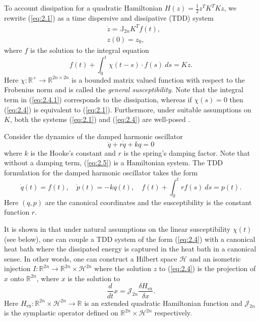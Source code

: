 To account dissipation for a quadratic Hamiltonian $H(z) = \frac 1 2 z^T K^T K  z$, we rewrite (\ref{eq:2.1}) as a time dispersive and dissipative (TDD) \cite{Figotin:2006jy} system 
\begin{equation} \label{eq:2.4}
	\begin{aligned}
		& \dot {z} = \mathbb J_{2n} K^T f(t), \\
		& z(0) = z_0,
	\end{aligned}
\end{equation}
where $f$ is the solution to the integral equation
\begin{equation} \label{eq:2.4.1}
	f(t) + \int_0^t \chi(t-s) \cdot f(s)\ ds = K z.
\end{equation}
Here $\chi:\mathbb R^+\to \mathbb R^{2n\times 2n}$ is a bounded matrix valued function with respect to the Frobenius norm and is called the \emph{general susceptibility}. Note that the integral term in (\ref{eq:2.4.1}) corresponds to the dissipation, whereas if $\chi(s) = 0$ then (\ref{eq:2.4}) is equivalent to (\ref{eq:2.1}). Furthermore, under suitable assumptions on $K$, both the systems (\ref{eq:2.1}) and (\ref{eq:2.4}) are well-posed \cite{Figotin:2006jy}.

\begin{example} \label{example:2.1}
Consider the dynamics of the damped harmonic oscillator
\begin{equation} \label{eq:2.5}
	\ddot q + r \dot q + k q = 0
\end{equation}
where $k$ is the Hooke's constant and $r$ is the spring's damping factor. Note that without a damping term, (\ref{eq:2.5}) is a Hamiltonian system. The TDD formulation for the damped harmonic oscillator takes the form
\begin{equation} \label{eq:2.6}
	\dot q(t) = f(t), \quad \dot p(t) = - k q(t), \quad f(t) + \int_0^t r f(s) \ ds = p(t).
\end{equation}
Here $(q,p)$ are the canonical coordinates and the susceptibility is the constant function $r$.
\end{example}

It is shown in \cite{Figotin:2006jy,Figotin:2005} that under natural assumptions on the linear susceptibility $\chi(t)$ (see below), one can couple a TDD system of the form (\ref{eq:2.4}) with a canonical heat bath where the dissipated energy is captured in the heat bath in a canonical sense. In other words, one can construct a Hilbert space $\mathcal H$ and an isometric injection $I:\mathbb R^{2n} \to \mathbb R^{2n}\times \mathcal H^{2n}$ where the solution $z$ to (\ref{eq:2.4}) is the projection of $x$ onto $\mathbb R^{2n}$, where $x$ is the solution to
\begin{equation} \label{eq:2.7}
	\frac{d}{dt} x = \mathcal J_{2n} \frac{\delta H_{\text{ex}}}{\delta x}.
\end{equation}
Here $H_{\text{ex}}:\mathbb R^{2n}\times \mathcal H^{2n} \to \mathbb R$ is an extended quadratic Hamiltonian function and $\mathcal J_{2n}$ is the symplastic operator defined on $\mathbb R^{2n}\times \mathcal H^{2n}$ respectively.

